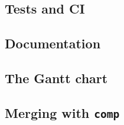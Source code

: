 \documentclass[a4paper,12pt]{article}
\begin{document}
\subsection{Tests and CI} %
\subsection{Documentation}
\subsection{The Gantt chart}
\subsection{Merging with \texttt{comp}}

\pagebreak
\printbibliography
\end{document}
